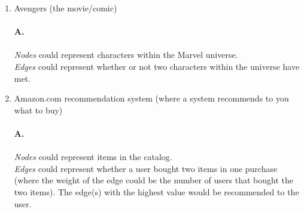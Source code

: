 \documentclass[12pt]{article}
\begin{document}
\begin{enumerate}
\begin{enumerate}[label=(\alph*)]
    \\
    \item Avengers (the movie/comic)
    \\\\
    \textbf{A.}
    \\\\
    \textit{Nodes} could represent characters within the Marvel universe.
    \\
    \textit{Edges} could represent whether or not two characters within the universe have met.
    \\
    \item Amazon.com recommendation system (where a system recommends to you what to buy)
    \\\\
    \textbf{A.}
    \\\\
    \textit{Nodes} could represent items in the catalog.
    \\
    \textit{Edges} could represent whether a user bought two items in one purchase (where the weight of the edge could be the number of users that bought the two items). The edge(s) with the highest value would be recommended to the user.
    \\
  \end{enumerate}
  
  

\end{enumerate}
\end{document}
